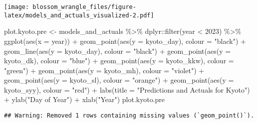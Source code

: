 \documentclass[
]{article}
\newenvironment{Shaded}{\begin{snugshade}}{\end{snugshade}}
\newcommand{\AttributeTok}[1]{\textcolor[rgb]{0.77,0.63,0.00}{#1}}
\newcommand{\DecValTok}[1]{\textcolor[rgb]{0.00,0.00,0.81}{#1}}
\newcommand{\FunctionTok}[1]{\textcolor[rgb]{0.00,0.00,0.00}{#1}}
\newcommand{\NormalTok}[1]{#1}
\newcommand{\OtherTok}[1]{\textcolor[rgb]{0.56,0.35,0.01}{#1}}
\newcommand{\SpecialCharTok}[1]{\textcolor[rgb]{0.00,0.00,0.00}{#1}}
\newcommand{\StringTok}[1]{\textcolor[rgb]{0.31,0.60,0.02}{#1}}
\begin{document}
\texttt{[image: blossom\_wrangle\_files/figure-latex/models\_and\_actuals\_visualized-2.pdf]}

\begin{Shaded}
\begin{Highlighting}[]
\NormalTok{plot.kyoto.pre }\OtherTok{\textless{}{-}}\NormalTok{ models\_and\_actuals }\SpecialCharTok{\%\textgreater{}\%}\NormalTok{ dplyr}\SpecialCharTok{::}\FunctionTok{filter}\NormalTok{(year }\SpecialCharTok{\textless{}} \DecValTok{2023}\NormalTok{) }\SpecialCharTok{\%\textgreater{}\%} 
  \FunctionTok{ggplot}\NormalTok{(}\FunctionTok{aes}\NormalTok{(}\AttributeTok{x =}\NormalTok{ year)) }\SpecialCharTok{+}
  \FunctionTok{geom\_point}\NormalTok{(}\FunctionTok{aes}\NormalTok{(}\AttributeTok{y =}\NormalTok{ kyoto\_day), }\AttributeTok{colour =} \StringTok{"black"}\NormalTok{) }\SpecialCharTok{+}
  \FunctionTok{geom\_line}\NormalTok{(}\FunctionTok{aes}\NormalTok{(}\AttributeTok{y =}\NormalTok{ kyoto\_day), }\AttributeTok{colour =} \StringTok{"black"}\NormalTok{) }\SpecialCharTok{+}
  \FunctionTok{geom\_point}\NormalTok{(}\FunctionTok{aes}\NormalTok{(}\AttributeTok{y =}\NormalTok{ kyoto\_dk), }\AttributeTok{colour =} \StringTok{"blue"}\NormalTok{) }\SpecialCharTok{+}
  \FunctionTok{geom\_point}\NormalTok{(}\FunctionTok{aes}\NormalTok{(}\AttributeTok{y =}\NormalTok{ kyoto\_kkw), }\AttributeTok{colour =} \StringTok{"green"}\NormalTok{) }\SpecialCharTok{+}
  \FunctionTok{geom\_point}\NormalTok{(}\FunctionTok{aes}\NormalTok{(}\AttributeTok{y =}\NormalTok{ kyoto\_mh), }\AttributeTok{colour =} \StringTok{"violet"}\NormalTok{) }\SpecialCharTok{+}
  \FunctionTok{geom\_point}\NormalTok{(}\FunctionTok{aes}\NormalTok{(}\AttributeTok{y =}\NormalTok{ kyoto\_sl), }\AttributeTok{colour =} \StringTok{"orange"}\NormalTok{) }\SpecialCharTok{+}
  \FunctionTok{geom\_point}\NormalTok{(}\FunctionTok{aes}\NormalTok{(}\AttributeTok{y =}\NormalTok{ kyoto\_syy), }\AttributeTok{colour =} \StringTok{"red"}\NormalTok{) }\SpecialCharTok{+}
  \FunctionTok{labs}\NormalTok{(}\AttributeTok{title =} \StringTok{"Predictions and Actuals for Kyoto"}\NormalTok{) }\SpecialCharTok{+}
  \FunctionTok{ylab}\NormalTok{(}\StringTok{"Day of Year"}\NormalTok{) }\SpecialCharTok{+}
  \FunctionTok{xlab}\NormalTok{(}\StringTok{"Year"}\NormalTok{)}
\NormalTok{plot.kyoto.pre}
\end{Highlighting}
\end{Shaded}

\begin{verbatim}
## Warning: Removed 1 rows containing missing values (`geom_point()`).
\end{verbatim}
\end{document}
